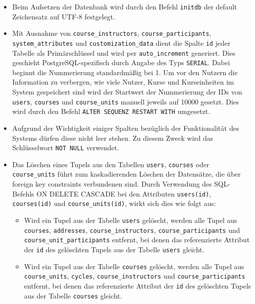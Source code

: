 \begin{itemize}
\item Beim Aufsetzen der Datenbank wird durch den Befehl \texttt{initdb} der default Zeichensatz auf UTF-8 festgelegt.

\item Mit Ausnahme von \texttt{course\_instructors}, \texttt{course\_participants}, \texttt{system\_attributes} und \texttt{customization\_data} dient die Spalte \texttt{id} jeder Tabelle als Primärschlüssel und wird per \texttt{auto\_increment} generiert. Dies geschieht PostgreSQL-spezifisch durch Angabe des Typs \texttt{SERIAL}. Dabei beginnt die Nummerierung standardmäßig bei 1. Um vor den Nutzern die Information zu verbergen, wie viele Nutzer, Kurse und Kurseinheiten im System gespeichert sind wird der Startwert der Nummerierung der IDs von \texttt{users}, \texttt{courses} und \texttt{course\_units} manuell jeweils auf 10000 gesetzt. Dies wird durch den Befehl \texttt{ALTER SEQUENZ RESTART WITH} umgesetzt.

\item Aufgrund der Wichtigkeit einiger Spalten bezüglich der Funktionalität des Systems dürfen diese nicht leer stehen. Zu diesem Zweck wird das Schlüsselwort \texttt{NOT NULL} verwendet.
\item Das Löschen eines Tupels aus den Tabellen \texttt{users}, \texttt{courses} oder \texttt{course\_units} führt zum kaskadierenden Löschen der Datensätze, die über foreign key constraints verbundenen sind. Durch Verwendung des SQL-Befehls ON DELETE CASCADE bei den Attributen \texttt{users(id)}, \texttt{courses(id)} und \texttt{course\_units(id)}, wirkt sich dies wie folgt aus:

\begin{itemize}
\item Wird ein Tupel aus der Tabelle \texttt{users} gelöscht, werden alle Tupel aus \texttt{courses}, \texttt{addresses}, \texttt{course\_instructors}, \texttt{course\_participants} und\\ \texttt{course\_unit\_participants} entfernt, bei denen das referenzierte Attribut der \texttt{id} des gelöschten Tupels aus der Tabelle \texttt{users} gleicht.

\item Wird ein Tupel aus der Tabelle \texttt{courses} gelöscht, werden alle Tupel aus \texttt{course\_units}, \texttt{cycles}, \texttt{course\_instructors} und \texttt{course\_participants} entfernt, bei denen das referenzierte Attribut der \texttt{id} des gelöschten Tupels aus der Tabelle \texttt{courses} gleicht.


\end{itemize}
\end{itemize}
